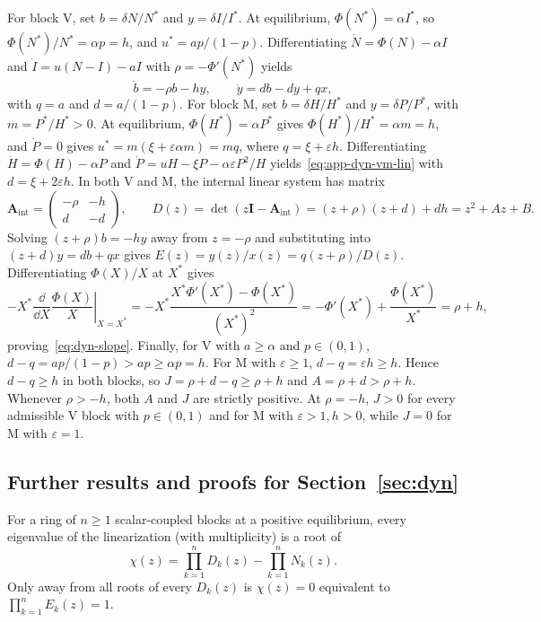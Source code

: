 For block V, set $b = \delta N / N^*$ and $y = \delta I / I^*$. At equilibrium, $\Phi(N^*) = \alpha I^*$, so $\Phi(N^*)/N^* = \alpha p = h$, and $u^* = ap/(1 - p)$. Differentiating $\dot{N} = \Phi(N) - \alpha I$ and $\dot{I} = u(N - I) - aI$ with $\rho = -\Phi'(N^*)$ yields
\begin{equation}\label{eq:app-dyn-vm-lin}
\dot{b} = -\rho b - hy, \qquad \dot{y} = db - dy + qx,
\end{equation}
with $q = a$ and $d = a/(1 - p)$. For block M, set $b = \delta H / H^*$ and $y = \delta P / P^*$, with $m = P^*/H^* > 0$. At equilibrium, $\Phi(H^*) = \alpha P^*$ gives $\Phi(H^*)/H^* = \alpha m = h$, and $\dot{P} = 0$ gives $u^* = m(\xi + \varepsilon\alpha m) = mq$, where $q = \xi + \varepsilon h$. Differentiating $\dot{H} = \Phi(H) - \alpha P$ and $\dot{P} = uH - \xi P - \alpha\varepsilon P^2/H$ yields~\eqref{eq:app-dyn-vm-lin} with $d = \xi + 2\varepsilon h$. In both V and M, the internal linear system has matrix
\[
\mathbf{A}_{\mathrm{int}} = \begin{pmatrix} -\rho & -h \\ d & -d \end{pmatrix}, \qquad D(z) = \det(z\mathbf{I} - \mathbf{A}_{\mathrm{int}}) = (z + \rho)(z + d) + dh = z^2 + Az + B.
\]
Solving $(z + \rho)b = -hy$ away from $z = -\rho$ and substituting into $(z + d)y = db + qx$ gives $E(z) = y(z)/x(z) = q(z + \rho)/D(z)$. Differentiating $\Phi(X)/X$ at $X^*$ gives
\[
-X^* \left.\frac{\dd}{\dd X}\frac{\Phi(X)}{X}\right|_{X = X^*} = -X^* \frac{X^* \Phi'(X^*) - \Phi(X^*)}{(X^*)^2} = -\Phi'(X^*) + \frac{\Phi(X^*)}{X^*} = \rho + h,
\]
proving~\eqref{eq:dyn-slope}. Finally, for V with $a \ge \alpha$ and $p \in (0, 1)$, $d - q = ap/(1 - p) > ap \ge \alpha p = h$. For M with $\varepsilon \ge 1$, $d - q = \varepsilon h \ge h$. Hence $d - q \ge h$ in both blocks, so $J = \rho + d - q \ge \rho + h$ and $A = \rho + d > \rho + h$. Whenever $\rho > -h$, both $A$ and $J$ are strictly positive. At $\rho = -h$, $J > 0$ for every admissible V block with $p \in (0, 1)$ and for M with $\varepsilon > 1, h > 0$, while $J = 0$ for M with $\varepsilon = 1$.

\subsection{Further results and proofs for Section~\ref{sec:dyn}}\label{subsec:app-dyn-proofs}

\begin{proposition}\label{prop:dyn-k1}
For a ring of $n \ge 1$ scalar-coupled blocks at a positive equilibrium, every eigenvalue of the linearization (with multiplicity) is a root of
\begin{equation}\label{eq:dyn-charpoly}
\chi(z) = \prod_{k=1}^n D_k(z) - \prod_{k=1}^n N_k(z).
\end{equation}
Only away from all roots of every $D_k(z)$ is $\chi(z) = 0$ equivalent to $\prod_{k=1}^n E_k(z) = 1$.
\end{proposition}


